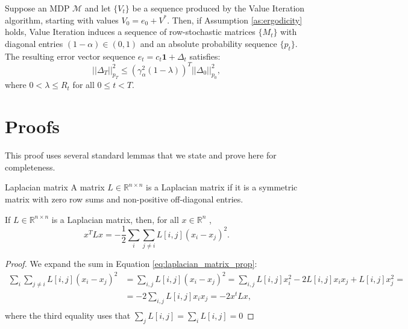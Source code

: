 \documentclass{article}
\begin{document}
\begin{corollary} \label{cor:main_result}
Suppose an MDP $\mathcal{M}$ and let $\{V_t\}$ be a sequence produced by the Value Iteration algorithm, starting with values $V_0 = e_0 + V^*$. Then, if Assumption \ref{as:ergodicity} holds, Value Iteration induces a sequence of row-stochastic matrices $\{M_t\}$ with diagonal entries $(1-\alpha) \in (0,1)$ and an absolute probability sequence $\{p_t\}$. The resulting error vector sequence $e_t = c_t \mathbf{1} + \Delta_t$ satisfies:
\begin{equation} \label{eq:main_result}
|| \Delta_{T}||_{p_T}^2 \leq (\gamma_\alpha^2(1-\lambda))^T || \Delta_{0}||_{p_0}^2,    
\end{equation}
where $0 < \lambda \leq R_t$ for all $0 \leq t < T$.
\end{corollary}

\section{Proofs}
This proof uses several standard lemmas that we state and prove here for completeness.
\begin{definition}{Laplacian matrix}
A matrix $L \in \mathbb{R}^{n \times n}$ is a Laplacian matrix if it is a symmetric
matrix with zero row sums and non-positive off-diagonal entries.
\end{definition}
\begin{lemma} \label{lem:lapl_matrix}
If $L \in \mathbb{R}^{n \times n}$ is a Laplacian matrix, then, for all $x \in \mathbb{R}^n$ ,
\begin{equation} \label{eq:laplacian_matrix_prop}
x^TLx = -\frac{1}{2} \sum_i \sum_{j \ne i} L[i,j] (x_i - x_j)^2.
\end{equation}
\end{lemma}
\begin{proof}
We expand the sum in Equation \ref{eq:laplacian_matrix_prop}:
\begin{align*}
\sum_i \sum_{j \ne i} L[i,j] (x_i - x_j)^2 &= \sum_{i,j}  L[i,j] (x_i - x_j)^2 = 
\sum_{i,j} L[i,j] x_i^2 - 2L[i,j] x_i x_j + L[i,j] x_j^2 = \\
&=-2\sum_{i,j} L[i,j] x_i x_j = -2x^tLx, \\
\end{align*}
where the third equality uses that $\sum_j L[i,j]=\sum_i L[i,j]=0$
\end{proof}
\end{document}
